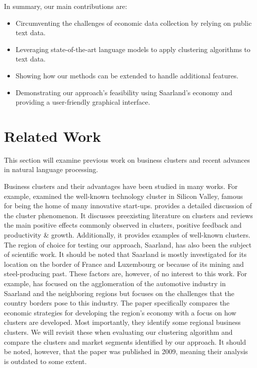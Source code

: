 \documentclass[12pt]{article}
\begin{document}
   In summary, our main contributions are:
   \begin{itemize}[noitemsep]
   	\item Circumventing the challenges of economic data collection by relying on public text data.
   	\item Leveraging state-of-the-art language models to apply clustering algorithms to text data.
   	\item Showing how our methods can be extended to handle additional features.
   	\item Demonstrating our approach's feasibility using Saarland's economy and providing a user-friendly graphical interface.
   \end{itemize}
   
   \section*{Related Work}
   This section will examine previous work on business clusters and recent advances in natural language processing.
   
   Business clusters and their advantages have been studied in many works. For example, \cite{regionaladv} examined the well-known technology cluster in Silicon Valley, famous for being the home of many innovative start-ups. 
   \cite{clustertheory} provides a detailed discussion of the cluster phenomenon. It discusses preexisting literature on clusters and reviews the main positive effects commonly observed in clusters, positive feedback and productivity \& growth. Additionally, it provides examples of well-known clusters.
   The region of choice for testing our approach, Saarland, has also been the subject of scientific work. It should be noted that Saarland is mostly investigated for its location on the border of France and Luxembourg or because of its mining and steel-producing past.
   These factors are, however, of no interest to this work. For example, \cite{saarlandeco1} has focused on the agglomeration of the automotive industry in Saarland and the neighboring regions but focuses on the challenges that the country borders pose to this industry.
   The paper \cite{saarlandeco2} specifically compares the economic strategies for developing the region's economy with a focus on how clusters are developed. Most importantly, they identify some regional business clusters. We will revisit these when evaluating our clustering algorithm and compare the clusters and market segments identified by our approach. It should be noted, however, that the paper was published in 2009, meaning their analysis is outdated to some extent.
   
\end{document}
